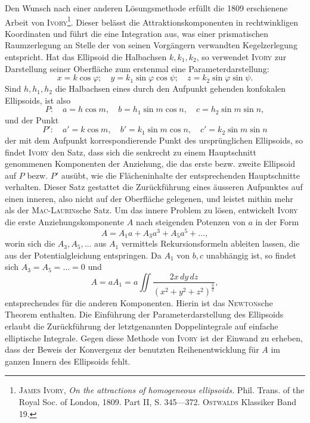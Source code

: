 Den Wunsch nach einer anderen Lösungsmethode erfüllt die 1809 erschienene
Arbeit von \textsc{Ivory}\footnote{\textsc{James Ivory}, \textit{On the attractions of homogeneous ellipsoids.} Phil. Trans. of the Royal Soc. of
London, 1809. Part II, S. 345—372. \textsc{Ostwalds} Klassiker Band 19.}. Dieser belässt die Attraktionskomponenten in
rechtwinkligen Koordinaten und führt die eine Integration aus, was einer prismatischen
Raumzerlegung an Stelle der von seinen Vorgängern verwandten
Kegelzerlegung entspricht. Hat das Ellipsoid die Halbachsen \(k,k_1,k_2\),
so verwendet \textsc{Ivory} zur Darstellung seiner Oberfläche zum erstenmal eine
Parameterdarstellung:
\[
x=k\cos\varphi;\quad y=k_1\sin\varphi\cos\psi;\quad z=k_2\sin\varphi\sin\psi.
\]
\noindent Sind \(h,h_1,h_2\) die Halbachsen eines durch den Aufpunkt gehenden konfokalen
Ellipsoids, ist also
\[
P:\quad a=h\cos m,\quad b=h_1\sin m\cos n,\quad c=h_2\sin m\sin n,
\]
\noindent und der Punkt
\[
P':\quad a'=k\cos m,\quad b'=k_1\sin m\cos n,\quad c'=k_2\sin m\sin n
\]
\noindent der mit dem Aufpunkt korrespondierende Punkt des ursprünglichen Ellipsoids,
so findet \textsc{Ivory} den Satz, dass sich die senkrecht zu einem Hauptschnitt genommenen
Komponenten der Anziehung, die das erste bezw. zweite Ellipsoid auf
\(P\) bezw. \(P'\) ausübt, wie die Flächeninhalte der entsprechenden Hauptschnitte
verhalten. Dieser Satz gestattet die Zurückführung eines äusseren Aufpunktes
auf einen inneren, also nicht auf der Oberfläche gelegenen, und leistet mithin
mehr als der \textsc{Mac-Laurin}sche Satz. Um das innere Problem zu lösen, entwickelt
\textsc{Ivory} die erste Anziehungskomponente \(A\) nach steigenden Potenzen
von \(a\) in der Form
\[
A=A_1a+A_3a^3+A_5a^5+\ldots,
\]
\noindent worin sich die \(A_3,A_5,\ldots\) aus \(A_1\) vermittels Rekursionsformeln ableiten lassen,
die aus der Potentialgleichung entspringen. Da \(A_1\) von \(b,c\) unabhängig ist, so
findet sich \(A_3=A_5=\ldots=0\) und
\[
A=aA_1=a\iint\frac{2x\,dy\,dz}{(x^2+y^2+z^2)^{\frac{3}{2}}},
\]
\clearpage{}
\noindent entsprechendes für die anderen Komponenten. Hierin ist das \textsc{Newton}sche Theorem
enthalten. Die Einführung der Parameterdarstellung des Ellipsoids erlaubt
die Zurückführung der letztgenannten Doppelintegrale auf einfache elliptische
Integrale. Gegen diese Methode von \textsc{Ivory} ist der Einwand zu erheben, dass
der Beweis der Konvergenz der benutzten Reihenentwicklung für \(A\) im ganzen
Innern des Ellipsoids fehlt.
\clearpage\endgroup
